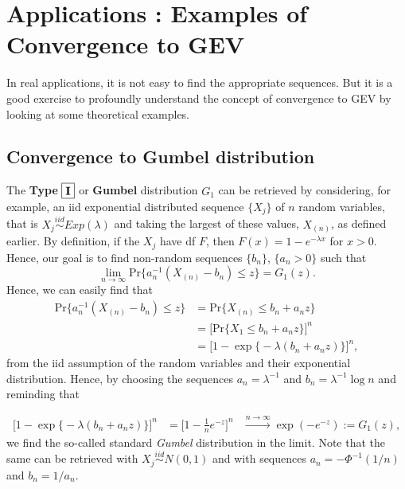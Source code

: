 \section{Applications : Examples of Convergence to GEV}\label{sec::appconcrete}

In real applications, it is not easy to find the appropriate sequences. But it is a good exercise to profoundly understand the concept of convergence to GEV by looking at some theoretical examples.


\subsection*{Convergence to Gumbel distribution}
The \textbf{Type}  $\boxed{\textbf{\text{I}}}$ or \textbf{Gumbel} distribution $G_1$ can be retrieved by considering, for example,  an iid exponential distributed sequence $\{X_j\}$ of $n$ random variables, that is $X_j\stackrel{iid}{\sim}Exp(\lambda)$ and taking the largest of these values, $X_{(n)}$, as defined earlier. By definition, if the $X_j$ have df $F$, then $F(x)=1-e^{-\lambda x}$ for $x>0$. Hence, our goal is to find non-random sequences $\{b_n\}$, $\{a_n>0\}$ such that 
\begin{equation}
\displaystyle{\lim_{n \to \infty}}\text{Pr}\Big\{ a_n^{-1}(X_{(n)}-b_n)\leq z\Big\}=G_1(z).
\end{equation}
Hence, we can easily find that
\begin{equation*}
\begin{aligned}
\text{Pr}\Big\{ a_n^{-1}(X_{(n)}-b_n)\leq z\Big\}
&=\text{Pr}\big\{X_{(n)}\leq b_n+a_nz\big\} \\ &=\Big[\text{Pr}\{X_1\leq b_n+a_nz\}\Big]^n \\
&=\Big[1-\exp\big\{-\lambda(b_n+a_nz)\big\}\Big]^n,
\end{aligned}
\end{equation*}
from the iid assumption of the random variables and their exponential distribution.
Hence, by choosing  the sequences $a_n=\lambda^{-1}$ and $b_n=\lambda^{-1}\log n$ and reminding that%


\begin{equation*}
\begin{aligned}
\Big[1-\exp\big\{-\lambda(b_n+a_nz)\big\}\Big]^n 
& = \Big[1-\frac{1}{n}e^{-z}\Big]^n %
& \stackrel{n\to\infty}{\longrightarrow} \exp(-e^{-z}):=G_1(z),
\end{aligned}
\end{equation*}
we find the so-called standard \emph{Gumbel} distribution in the limit. 
Note that the same can be retrieved with $X_j\stackrel{iid}{\sim}N(0,1)$ and with sequences $a_n=-\Phi^{-1}(1/n)$ and $b_n=1/a_n$. 

